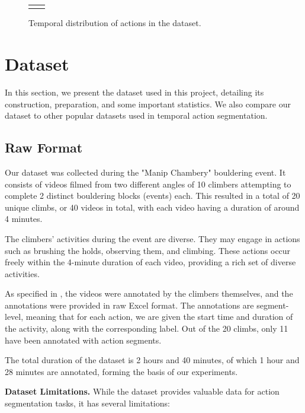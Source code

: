 \begin{figure}[t]
\begin{tabular}{@{}cc@{}}
    \begin{minipage}{0.45\textwidth}\centering\caption{Distribution of actions in the dataset.}\label{figure:distribution-of-actions-in-dataset}\end{minipage} &
    \begin{minipage}{0.45\textwidth}\centering\caption{Temporal distribution of actions in the dataset.}\label{figure:temporal-distribution-of-actions}\end{minipage}
  \end{tabular}
\end{figure}
\section{Dataset}

In this section, we present the dataset used in this project, detailing its construction, preparation, and some important statistics. We also compare our dataset to other popular datasets used in temporal action segmentation.

\subsection{Raw Format}

Our dataset was collected during the "Manip Chambery" bouldering event. It consists of videos filmed from two different angles of 10 climbers attempting to complete 2 distinct bouldering blocks (events) each. This resulted in a total of 20 unique climbs, or 40 videos in total, with each video having a duration of around 4 minutes.

The climbers' activities during the event are diverse. They may engage in actions such as brushing the holds, observing them, and climbing. These actions occur freely within the 4-minute duration of each video, providing a rich set of diverse activities.

As specified in \cite{section:context}, the videos were annotated by the climbers themselves, and the annotations were provided in raw Excel format. The annotations are segment-level, meaning that for each action, we are given the start time and duration of the activity, along with the corresponding label. Out of the 20 climbs, only 11 have been annotated with action segments.

The total duration of the dataset is 2 hours and 40 minutes, of which 1 hour and 28 minutes are annotated, forming the basis of our experiments.

\noindent\textbf{Dataset Limitations.}
\label{subsection:dataset-limitations}
While the dataset provides valuable data for action segmentation tasks, it has several limitations: 


